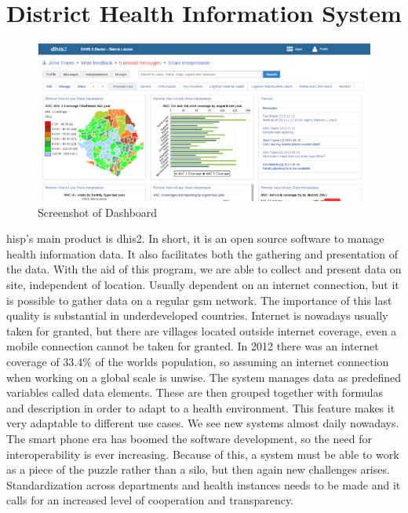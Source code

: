\cite{strategyhisp:uio}
\cite{networkhisp:uio}
\cite{jbemss:noa}

\section{District Health Information System}
\begin{figure}
\centering
\includegraphics[width=\textwidth]{context/img/dhis2Dash}
\caption{Screenshot of Dashboard}
\label{fig:dash}
\end{figure}
\gls{hisp}'s main product is \gls{dhis2}. 
In short, it is an open source software to manage health information data. 
It also facilitates both the gathering and presentation of the data. 
With the aid of this program, we are able to collect and present data on site, independent of location.
Usually dependent on an internet connection, but it is possible to gather data on a regular \gls{gsm} network. 
The importance of this last quality is substantial in underdeveloped countries. 
Internet is nowadays usually taken for granted, but there are villages located outside internet coverage, even a mobile connection cannot be taken for granted. 
In 2012 there was an internet coverage of $33.4\%$ of the worlds population, so assuming an internet connection when working on a global scale is unwise. 
The system manages data as predefined variables called data elements. 
These are then grouped together with formulas and description in order to adapt to a health environment. 
This feature makes it very adaptable to different use cases. 
We see new systems almost daily nowadays. 
The smart phone era has boomed the software development, so the need for interoperability is ever increasing. 
Because of this, a system must be able to work as a piece of the puzzle rather than a silo, but then again new challenges arises. 
Standardization across departments and health instances needs to be made and it calls for an increased level of cooperation and transparency.






